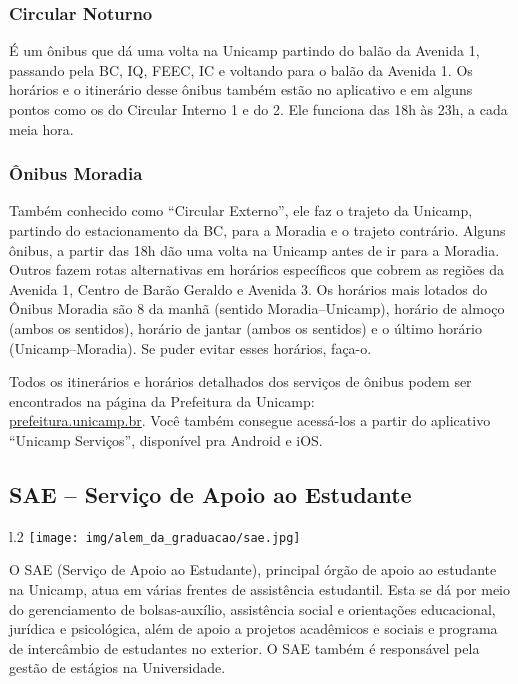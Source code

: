 \subsubsection{Circular Noturno}
É um ônibus que dá uma volta na Unicamp partindo do balão da Avenida 1, passando
pela BC, IQ, FEEC, IC e voltando para o balão da Avenida 1. Os horários e o
itinerário desse ônibus também estão no aplicativo e em alguns pontos como os
do Circular Interno 1 e do 2. Ele funciona das 18h às 23h, a cada meia hora.

\subsubsection{Ônibus Moradia}
Também conhecido como ``Circular Externo'', ele faz o trajeto da Unicamp,
partindo do estacionamento da BC, para a Moradia e o trajeto contrário. Alguns
ônibus, a partir das 18h dão uma volta na Unicamp antes de ir para a
Moradia. Outros fazem rotas alternativas em horários específicos que cobrem as
regiões da Avenida 1, Centro de Barão Geraldo e Avenida 3. Os horários mais
lotados do Ônibus Moradia são 8 da manhã (sentido Moradia--Unicamp), horário de
almoço (ambos os sentidos), horário de jantar (ambos os sentidos) e o último
horário (Unicamp--Moradia). Se puder evitar esses horários, faça-o.

Todos os itinerários e horários detalhados dos serviços de ônibus podem ser
encontrados na página da Prefeitura da Unicamp: \\\url{prefeitura.unicamp.br}.
Você também consegue acessá-los a partir do aplicativo ``Unicamp Serviços'',
disponível pra Android e iOS.

\subsection{SAE -- Serviço de Apoio ao Estudante}
\begin{wrapfigure}{l}{.2\textwidth}
    \centering
    \texttt{[image: img/alem\_da\_graduacao/sae.jpg]}
\end{wrapfigure}
O SAE (Serviço de Apoio ao Estudante), principal órgão de apoio ao estudante na
Unicamp, atua em várias frentes de assistência estudantil. Esta se dá por meio
do gerenciamento de bolsas-auxílio, assistência social e orientações
educacional, jurídica e psicológica, além de apoio a projetos acadêmicos e
sociais e programa de intercâmbio de estudantes no exterior. O SAE também é
responsável pela gestão de estágios na Universidade.

